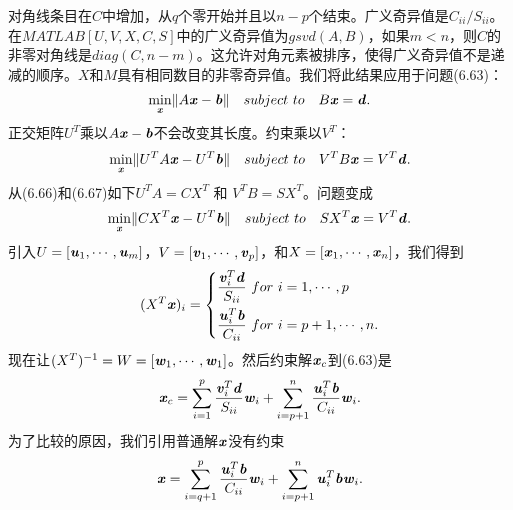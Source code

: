 对角线条目在$C$中增加，从$q$个零开始并且以$n-p$个结束。广义奇异值是$ C_{ii}/S_{ii}$。在$MATLAB[U,V,X,C,S]$中的广义奇异值为$gsvd(A,B)$，如果$m<n$，则$C$的非零对角线是$diag(C,n-m)$。这允许对角元素被排序，使得广义奇异值不是递减的顺序。$X$和$M$具有相同数目的非零奇异值。我们将此结果应用于问题(6.63)：
\begin{align*}
\min_{\textbf{\textit{x}}} \lVert A\textbf{\textit{x}}-\textbf{\textit{b}} \rVert \quad subject \ to \quad
B\textbf{\textit{x}} = \textbf{\textit{d}}.
\end{align*}
正交矩阵$U^{T}$乘以$ A\textbf{\textit{x}}-\textbf{\textit{b}}$不会改变其长度。约束乘以$V^{T}$：
\begin{align*}
\min_{\textbf{\textit{x}}} \lVert U^{T}A\textbf{\textit{x}}-U^{T}\textbf{\textit{b}} \rVert \quad subject \ to \quad
V^{T}B\textbf{\textit{x}} = V^{T}\textbf{\textit{d}}.
\end{align*}
从(6.66)和(6.67)如下$U^{T}A = CX^{T} $ 和 $V^{T}B=SX^{T} $。问题变成
\begin{align*}
\min_{\textbf{\textit{x}}} \lVert  CX^{T}\textbf{\textit{x}}-U^{T}\textbf{\textit{b}} \rVert \quad subject \ to \quad
SX^{T}\textbf{\textit{x}} = V^{T}\textbf{\textit{d}}.
\end{align*}
引入$U=[\textbf{\textit{u}}_{1},\cdots,\textbf{\textit{u}}_{m}]$，$V=[\textbf{\textit{v}}_{1},\cdots,\textbf{\textit{v}}_{p}]$，和$X=[\textbf{\textit{x}}_{1},\cdots,\textbf{\textit{x}}_{n}]$，我们得到
\begin{align*}
(X^{T}\textbf{\textit{x}})_{i} = 
\left\{
\begin{aligned}
\dfrac{\textbf{\textit{v}}^{T}_{i}\textbf{\textit{d}}}{S_{ii}} \ for \ i&=1,\cdots,p \\
\dfrac{\textbf{\textit{u}}^{T}_{i}\textbf{\textit{b}}}{C_{ii}} \ for \ i&=p+1,\cdots,n. 
\end{aligned}
\right.
\end{align*}
现在让$ (X^{T})^{-1} = W = [\textbf{\textit{w}}_{1},\cdots,\textbf{\textit{w}}_{1}]$。然后约束解$\textbf{\textit{x}}_{c}$到(6.63)是
\begin{align}
\textbf{\textit{x}}_{c} = 
\sum_{i=1}^p\dfrac{\textbf{\textit{v}}^{T}_{i}\textbf{\textit{d}}}{S_{ii}}\textbf{\textit{w}}_{i} + 
\sum_{i=p+1}^n\dfrac{\textbf{\textit{u}}^{T}_{i}\textbf{\textit{b}}}{C_{ii}}\textbf{\textit{w}}_{i}.
\end{align}
为了比较的原因，我们引用普通解$\textbf{\textit{x}}$没有约束
\begin{align}
\textbf{\textit{x}} = 
\sum_{i=q+1}^p\dfrac{\textbf{\textit{u}}^{T}_{i}\textbf{\textit{b}}}{C_{ii}}\textbf{\textit{w}}_{i} + 
\sum_{i=p+1}^n\textbf{\textit{u}}^{T}_{i}\textbf{\textit{b}}\textbf{\textit{w}}_{i}.
\end{align}
